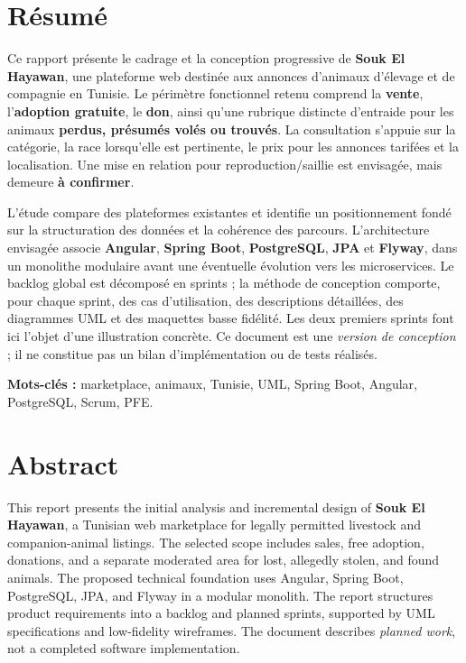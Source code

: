 \chapter*{Résumé}
Ce rapport présente le cadrage et la conception progressive de \textbf{Souk El Hayawan}, une plateforme web destinée aux annonces d’animaux d’élevage et de compagnie en Tunisie. Le périmètre fonctionnel retenu comprend la \textbf{vente}, l’\textbf{adoption gratuite}, le \textbf{don}, ainsi qu’une rubrique distincte d’entraide pour les animaux \textbf{perdus, présumés volés ou trouvés}. La consultation s’appuie sur la catégorie, la race lorsqu’elle est pertinente, le prix pour les annonces tarifées et la localisation. Une mise en relation pour reproduction/saillie est envisagée, mais demeure \textbf{à confirmer}.

L’étude compare des plateformes existantes et identifie un positionnement fondé sur la structuration des données et la cohérence des parcours. L’architecture envisagée associe \textbf{Angular}, \textbf{Spring Boot}, \textbf{PostgreSQL}, \textbf{JPA} et \textbf{Flyway}, dans un monolithe modulaire avant une éventuelle évolution vers les microservices. Le backlog global est décomposé en sprints ; la méthode de conception comporte, pour chaque sprint, des cas d’utilisation, des descriptions détaillées, des diagrammes UML et des maquettes basse fidélité. Les deux premiers sprints font ici l’objet d’une illustration concrète. Ce document est une \textit{version de conception} ; il ne constitue pas un bilan d’implémentation ou de tests réalisés.

\noindent\textbf{Mots-clés :} marketplace, animaux, Tunisie, UML, Spring Boot, Angular, PostgreSQL, Scrum, PFE.

\chapter*{Abstract}
This report presents the initial analysis and incremental design of \textbf{Souk El Hayawan}, a Tunisian web marketplace for legally permitted livestock and companion-animal listings. The selected scope includes sales, free adoption, donations, and a separate moderated area for lost, allegedly stolen, and found animals. The proposed technical foundation uses Angular, Spring Boot, PostgreSQL, JPA, and Flyway in a modular monolith. The report structures product requirements into a backlog and planned sprints, supported by UML specifications and low-fidelity wireframes. The document describes \textit{planned work}, not a completed software implementation.

